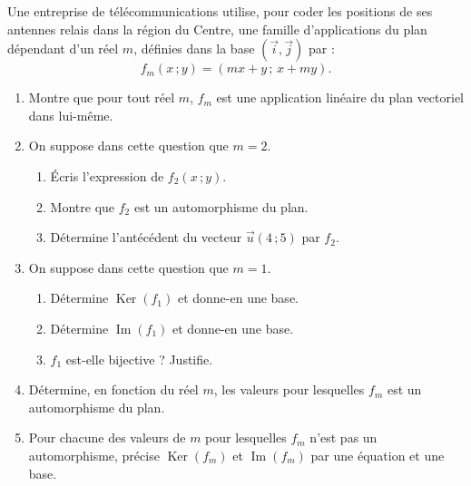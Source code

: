 \documentclass[11pt]{article}
\begin{document}
\begin{exercice}
Une entreprise de télécommunications utilise, pour coder les positions de ses antennes relais dans la région du Centre, une famille d'applications du plan dépendant d'un réel $m$, définies dans la base $(\vec{i},\vec{j})$ par :
\[ f_m(x\,;y)=(mx+y\,;\,x+my). \]
\begin{enumerate}
\item Montre que pour tout réel $m$, $f_m$ est une application linéaire du plan vectoriel dans lui-même.
\item On suppose dans cette question que $m=2$.
\begin{enumerate}
\item Écris l'expression de $f_2(x\,;y)$.
\item Montre que $f_2$ est un automorphisme du plan.
\item Détermine l'antécédent du vecteur $\vec{u}(4\,;5)$ par $f_2$.
\end{enumerate}
\item On suppose dans cette question que $m=1$.
\begin{enumerate}
\item Détermine $\operatorname{Ker}(f_1)$ et donne-en une base.
\item Détermine $\operatorname{Im}(f_1)$ et donne-en une base.
\item $f_1$ est-elle bijective ? Justifie.
\end{enumerate}
\item Détermine, en fonction du réel $m$, les valeurs pour lesquelles $f_m$ est un automorphisme du plan.
\item Pour chacune des valeurs de $m$ pour lesquelles $f_m$ n'est pas un automorphisme, précise $\operatorname{Ker}(f_m)$ et $\operatorname{Im}(f_m)$ par une équation et une base.
\end{enumerate}
\end{exercice}
\end{document}
